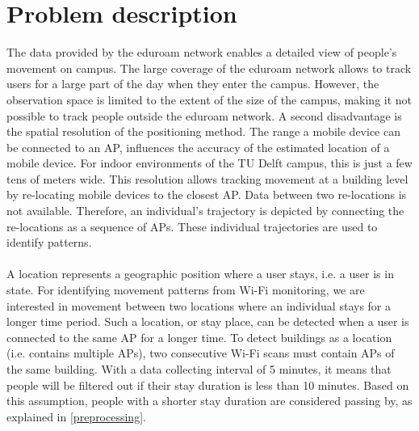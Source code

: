 \section{Problem description}
The data provided by the eduroam network enables a detailed view of people’s movement on campus. The large coverage of the eduroam network allows to track users for a large part of the day when they enter the campus. However, the observation space is limited to the extent of the size of the campus, making it not possible to track people outside the eduroam network. A second disadvantage is the spatial resolution of the positioning method. The range a mobile device can be connected to an AP,  influences the accuracy of the estimated location of a mobile device. For indoor environments of the TU Delft campus, this is just a few tens of meters wide. This resolution allows tracking movement at a building level by re-locating mobile devices to the closest AP. Data between two re-locations is not available. Therefore, an individual’s trajectory is depicted by connecting the re-locations as a sequence of APs. These individual trajectories are used to identify patterns. \\\\
A location represents a geographic position where a user stays, i.e. a user is in state. For identifying movement patterns from Wi-Fi monitoring, we are interested in movement between two locations where an individual stays for a longer time period. Such a location, or stay place, can be detected when a user is connected to the same AP for a longer time. To detect  buildings as a location (i.e. contains multiple APs), two consecutive Wi-Fi scans must contain  APs of the same building. With a data collecting interval of 5 minutes, it means that people will be filtered out if their stay duration is less than 10 minutes. Based on this assumption, people with a shorter stay duration are considered passing by, as explained in \autoref{preprocessing}.

